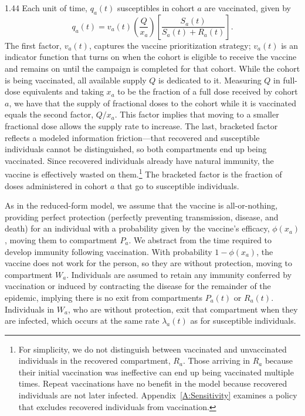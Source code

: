 \documentclass[12pt]{article}
\newcommand{\efficacy}{\phi}
\begin{document}
\begin{spacing}{1.44}
Each unit of time, $q_a(t)$ susceptibles in cohort $a$ are vaccinated, given by
\begin{equation}
\label{qat}
q_a(t) = v_a(t) \left( \frac{Q}{x_a} \right) \left[ \frac{S_a(t)}{S_a(t) + R_a(t)} \right].
\end{equation}
The first factor, $v_a(t)$, captures the vaccine prioritization strategy; $v_a(t)$ is an indicator function
that turns on when the cohort is eligible to receive the vaccine and
remains on until the campaign is completed for that cohort. While the cohort is being vaccinated, all available supply $Q$ is dedicated to it. Measuring $Q$ in full-dose equivalents and taking $x_a$ to be the fraction of a full dose received by cohort $a$, we have that the supply of fractional doses to the cohort while it is vaccinated equals the second factor, $Q/x_a$. This factor implies that moving to a smaller fractional dose allows the supply rate to increase. The last, bracketed factor reflects a modeled information friction---that recovered and susceptible individuals cannot be distinguished, so
both compartments end up being vaccinated. Since recovered individuals
already have natural immunity, the vaccine is effectively wasted on
them.\footnote{For simplicity, we do not distinguish between vaccinated and unvaccinated individuals in the recovered compartment, $R_a$. Those arriving in $R_a$ because their initial vaccination was ineffective can end up being vaccinated multiple times. Repeat vaccinations have no benefit in the model because recovered individuals are not later infected. Appendix~\ref{A:Sensitivity} examines a policy that excludes recovered individuals from vaccination.} The bracketed factor is the fraction of doses administered in cohort $a$ that go to susceptible individuals.

As in the
reduced-form model, we assume that the vaccine is all-or-nothing,
providing perfect protection (perfectly preventing transmission,
disease, and death) for an individual with a probability given by the
vaccine's efficacy, $\efficacy(x_a)$, moving them to compartment
$P_a$. We abstract from the time required to develop immunity
following vaccination. With probability $1 - \efficacy(x_a)$, the
vaccine does not work for the person, so they are without protection,
moving to compartment $W_a$. Individuals are assumed to retain any immunity conferred by vaccination or induced by contracting the disease for the remainder of the epidemic, implying there is no exit from compartments $P_a(t)$ or $R_a(t)$. Individuals in $W_a$, who are without protection, exit that compartment when they are infected,
which occurs at the same rate $\lambda_a(t)$ as for susceptible
individuals.


\end{spacing}
\end{document}
